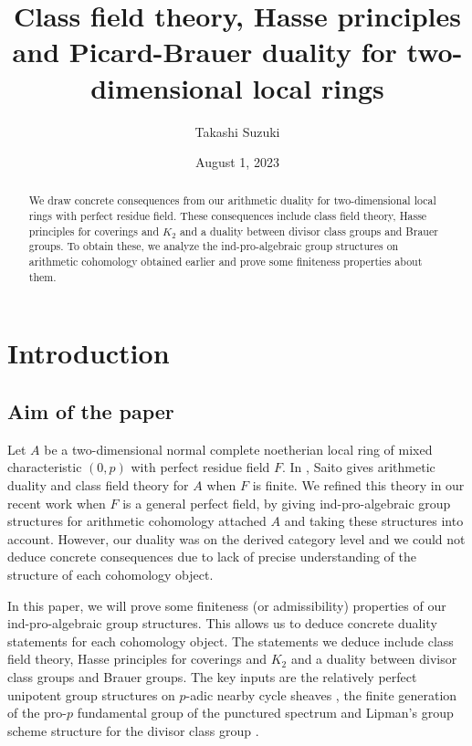 \documentclass{amsart}
\title[Class field theory, Hasse principles, Pic-Br]
	{Class field theory, Hasse principles and Picard-Brauer duality for two-dimensional local rings}
\author{Takashi Suzuki}
\date{August 1, 2023}
\theoremstyle{remark}
\numberwithin{equation}{section}
\begin{document}
\begin{abstract}
	We draw concrete consequences from our arithmetic duality
	for two-dimensional local rings with perfect residue field.
	These consequences include class field theory, Hasse principles for coverings and $K_{2}$
	and a duality between divisor class groups and Brauer groups.
	To obtain these,
	we analyze the ind-pro-algebraic group structures on arithmetic cohomology obtained earlier
	and prove some finiteness properties about them.
\end{abstract}

\maketitle

\tableofcontents


\section{Introduction}


\subsection{Aim of the paper}

Let $A$ be a two-dimensional normal complete noetherian local ring
of mixed characteristic $(0, p)$ with perfect residue field $F$.
In \cite{Sai86, Sai87},
Saito gives arithmetic duality and class field theory for $A$ when $F$ is finite.
We refined this theory in our recent work \cite{Suz24} when $F$ is a general perfect field,
by giving ind-pro-algebraic group structures for arithmetic cohomology attached $A$
and taking these structures into account.
However, our duality was on the derived category level
and we could not deduce concrete consequences
due to lack of precise understanding of the structure of each cohomology object.

In this paper, we will prove some finiteness (or admissibility) properties of
our ind-pro-algebraic group structures.
This allows us to deduce concrete duality statements
for each cohomology object.
The statements we deduce include class field theory,
Hasse principles for coverings and $K_{2}$
and a duality between divisor class groups and Brauer groups.
The key inputs are the relatively perfect unipotent group structures
on $p$-adic nearby cycle sheaves \cite{BS20},
the finite generation of the pro-$p$ fundamental group of the punctured spectrum \cite{Suz23}
and Lipman's group scheme structure for the divisor class group \cite{Lip69, Lip76}.
\end{document}

